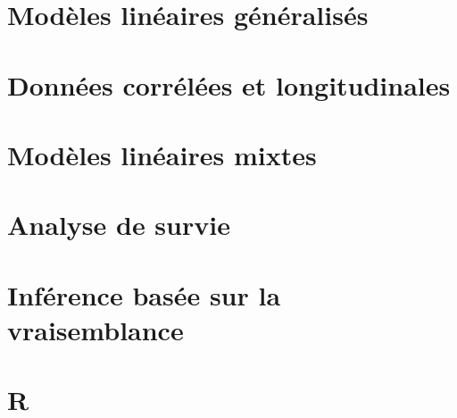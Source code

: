 \documentclass[
  11pt,
  letterpaper,
]{book}
\begin{document}
\hypertarget{modeles-lineaires-generalises}{%
\chapter{Modèles linéaires généralisés}\label{modeles-lineaires-generalises}}

\hypertarget{donnees-correlees-longitudinales}{%
\chapter{Données corrélées et longitudinales}\label{donnees-correlees-longitudinales}}

\hypertarget{modeles-lineaires-mixtes}{%
\chapter{Modèles linéaires mixtes}\label{modeles-lineaires-mixtes}}

\hypertarget{survie}{%
\chapter{Analyse de survie}\label{survie}}

\hypertarget{vraisemblance}{%
\chapter{Inférence basée sur la vraisemblance}\label{vraisemblance}}

\hypertarget{appendix-annexe}{%
\appendix}


\hypertarget{r}{%
\chapter*{\texorpdfstring{\textbf{R}}{R}}\label{r}}

  
\end{document}
